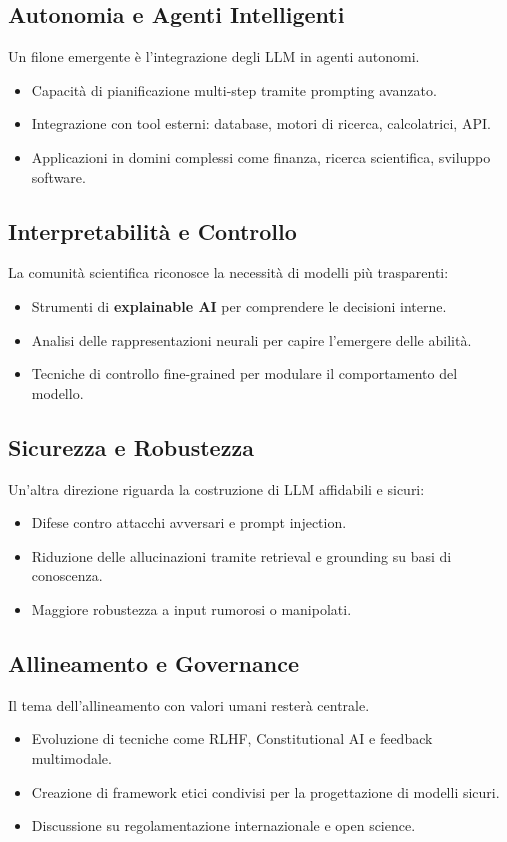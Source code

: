 \subsection{Autonomia e Agenti Intelligenti}
Un filone emergente è l'integrazione degli LLM in agenti autonomi.
\begin{itemize}
    \item Capacità di pianificazione multi-step tramite prompting avanzato.
    \item Integrazione con tool esterni: database, motori di ricerca, calcolatrici, API.
    \item Applicazioni in domini complessi come finanza, ricerca scientifica, sviluppo software.
\end{itemize}

\subsection{Interpretabilità e Controllo}
La comunità scientifica riconosce la necessità di modelli più trasparenti:
\begin{itemize}
    \item Strumenti di \textbf{explainable AI} per comprendere le decisioni interne.
    \item Analisi delle rappresentazioni neurali per capire l'emergere delle abilità.
    \item Tecniche di controllo fine-grained per modulare il comportamento del modello.
\end{itemize}

\subsection{Sicurezza e Robustezza}
Un'altra direzione riguarda la costruzione di LLM affidabili e sicuri:
\begin{itemize}
    \item Difese contro attacchi avversari e prompt injection.
    \item Riduzione delle allucinazioni tramite retrieval e grounding su basi di conoscenza.
    \item Maggiore robustezza a input rumorosi o manipolati.
\end{itemize}

\subsection{Allineamento e Governance}
Il tema dell'allineamento con valori umani resterà centrale.
\begin{itemize}
    \item Evoluzione di tecniche come RLHF, Constitutional AI e feedback multimodale.
    \item Creazione di framework etici condivisi per la progettazione di modelli sicuri.
    \item Discussione su regolamentazione internazionale e open science.
\end{itemize}


